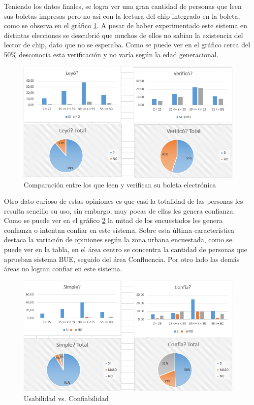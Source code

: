 Teniendo los datos finales, se logra ver una gran cantidad de personas que leen sus boletas impresas pero no asi con la lectura del chip integrado en la boleta, como se observa en el gráfico \ref{graf:votantes}. A pesar de haber experimentado este sistema en distintas elecciones se descubrió que muchos de ellos no sabian la existencia del lector de chip, dato que no se esperaba. Como se puede ver en el gráfico cerca del 50\% desconocía esta verificación y no varía según la edad generacional.

\begin{figure}[h!]
  \includegraphics[width=\textwidth]{yfrjnCosp0.png}
  \caption{Comparación entre los que leen y verifican su boleta electrónica}
  \label{graf:votantes}
\end{figure}

Otro dato curioso de estas opiniones es que casi la totalidad de las personas les resulta sencillo su uso, sin embargo, muy pocas de ellas les genera confianza. Como se puede ver en el gráfico \ref{graf:votantesUsoConfia} la mitad de los encuestados les genera confianza o intentan confiar en este sistema. Sobre esta última característica destaca la variación de opiniones según la zona urbana encuestada, como se puede ver en la tabla, en el área centro se concentra la cantidad de personas que aprueban sistema BUE, seguido del área Confluencia. Por otro lado las demás áreas no logran confiar en este sistema. 
\begin{figure}[h!]
  \includegraphics[width=\textwidth]{SLLXOorTia.png}
  \caption{Usabilidad vs. Confiabilidad}
  \label{graf:votantesUsoConfia}
\end{figure}

